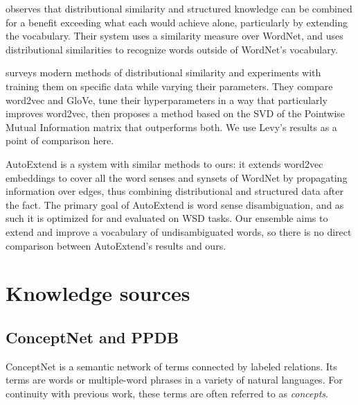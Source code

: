 \documentclass[11pt,letterpaper]{article}
\begin{document}

 observes that distributional similarity and
structured knowledge can be combined for a benefit exceeding what each would
achieve alone, particularly by extending the vocabulary. Their system uses a
similarity measure over WordNet, and uses distributional similarities to
recognize words outside of WordNet's vocabulary.

 surveys modern methods of distributional
similarity and experiments with training them on specific data while varying
their parameters. They compare word2vec and GloVe, tune their hyperparameters
in a way that particularly improves word2vec, then proposes a method based on
the SVD of the Pointwise Mutual Information matrix that outperforms both. We
use Levy's results as a point of comparison here.

AutoExtend \cite{rothe2015autoextend} is a system with similar methods to
ours: it extends word2vec embeddings to cover all the word senses and synsets of
WordNet by propagating information over edges, thus combining distributional and
structured data after the fact. The primary goal of AutoExtend is word sense
disambiguation, and as such it is optimized for and evaluated on WSD tasks.
Our ensemble aims to extend and improve a vocabulary of undisambiguated words,
so there is no direct comparison between AutoExtend's results and ours.

\section{Knowledge sources}

\subsection{ConceptNet and PPDB}
ConceptNet \cite{speer2012conceptnet} is a semantic network of terms
connected by labeled relations. Its terms are words or multiple-word phrases
in a variety of natural languages. For continuity with previous work,
these terms are often referred to as {\em concepts}.
\end{document}
